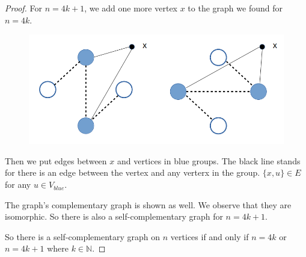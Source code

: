 \begin{proof}
For $n=4k+1$, we add one more vertex $x$ to the graph we found for $n=4k$.
\begin{figure}[hpbt]
\begin{center}
\includegraphics[width=0.6 \textwidth]{Ex6-6_2.png}
\end{center}
\end{figure}
Then we put edges between $x$ and vertices in blue groups. The black line stands for there is an edge between the vertex and any verterx in the group. $\{x, u\} \in E$ for any $u \in V_{blue}$.
\par
The graph's complementary graph is shown as well. We observe that they are isomorphic. So there is also a self-complementary graph for $n=4k+1$.   

\par So there is a self-complementary graph on $n$ vertices if and only if $n=4k$ or $n=4k+1$ where $k \in \mathbb{N}$.
\end{proof}